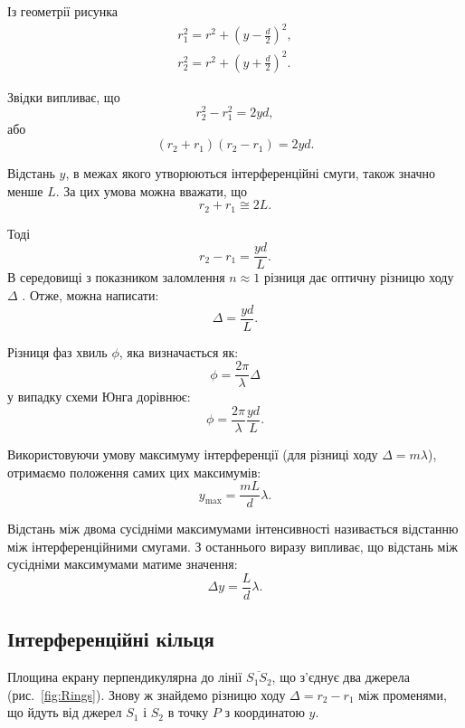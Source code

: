 Із геометрії рисунка
\begin{align*}
	r_1^2 = {r^2} + {\left( y - \frac{d}{2}\right) ^2}, \\
	r_2^2 = {r^2} + {\left( y + \frac{d}{2}\right) ^2}.
\end{align*}

Звідки випливає, що
\begin{equation*}
	r_2^2 - r_1^2 = 2yd,
\end{equation*}
або
\begin{equation*}
	({r_2} + {r_1})({r_2} - {r_1}) = 2yd.
\end{equation*}

 Відстань $y$, в межах якого утворюються інтерференційні смуги, також значно менше $L$. За цих умова можна вважати, що 
\[{r_2} + {r_1} \cong 2L.\] 

Тоді \[{r_2} - {r_1} = \frac{{yd}}{L}.\] В середовищі з показником заломлення $n \approx 1$ різниця дає оптичну різницю ходу $\Delta$ . Отже, можна написати:
\begin{equation}
	\Delta  = \frac{{yd}}{L}.
\end{equation}

Різниця фаз хвиль $\phi$, яка визначається як:
\begin{equation}\label{eq:Phase_Diff}
    \phi = \frac{2\pi}{\lambda} \Delta
\end{equation}
у випадку схеми Юнга дорівнює:
\[
    \phi = \frac{2\pi}{\lambda} \frac{{yd}}{L}.
\]

Використовуючи умову максимуму інтерференції (для різниці ходу $\Delta = m\lambda$), отримаємо положення самих цих максимумів:
\begin{equation}
	y_{\max} = \frac{{mL}}{d}\lambda.
\end{equation}

Відстань між двома сусідніми максимумами інтенсивності називається відстанню між інтерференційними смугами.  З останнього виразу випливає, що відстань між сусідніми максимумами матиме значення:
\begin{equation}\label{eq:widthofmax}
	\Delta y = \frac{L}{d}\lambda.
\end{equation}

\subsection{Інтерференційні кільця}

Площина екрану перпендикулярна до лінії $\overline{S_1S_2}$, що з'єднує два джерела (рис.~\ref{fig:Rings}). Знову ж знайдемо різницю ходу $\Delta = r_2 - r_1$ між променями, що йдуть від джерел $S_1$ і $S_2$ в точку $P$ з координатою $y$.

